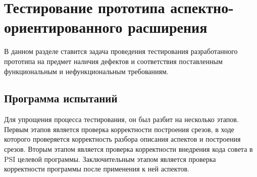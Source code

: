 \chapter{Тестирование прототипа аспектно-ориентированного расширения}
В данном разделе ставится задача проведения тестирования разработанного прототипа на предмет наличия дефектов и соответствия поставленным функциональным и нефункциональным требованиям.
\section{Программа испытаний}
\label{sec:testing_program}
Для упрощения процесса тестирования, он был разбит на несколько этапов.
Первым этапов является проверка корректности построения срезов, в ходе которого проверяется корректность разбора описания аспектов и построения срезов.
Вторым этапом является проверка корректности внедрения кода совета в PSI целевой программы.
Заключительным этапом является проверка корректности программы после применения к ней аспектов.

